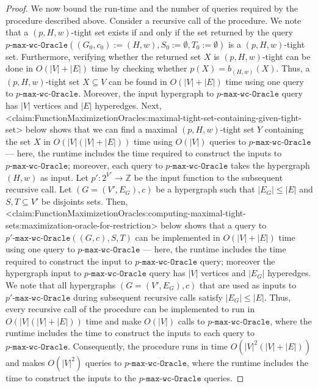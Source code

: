 \documentclass{article}
\def\Cref#1{<#1>}%
\newcommand{\functionMaximizationOracle}[1]{\ensuremath{{#1}\text{-}\mathtt{max}\text{-}\mathtt{wc}\text{-}\mathtt{Oracle}}\xspace}
\providecommand{\Z}{\mathbb{Z}}
\begin{document}
\begin{proof}
We now bound the run-time and the number of queries required by the procedure described above. Consider a recursive call of the procedure.
We note that a $(p, H, w)$-tight set exists if and only if the set returned by the query $\functionMaximizationOracle{p}((G_0, c_0):= (H, w), S_0:=\emptyset, T_0:=\emptyset)$ is a $(p, H, w)$-tight set.
Furthermore, verifying whether the returned set $X$ is $(p, H, w)$-tight can be done in $O(|V| + |E|)$ time by checking whether $p(X) = b_{(H,w)}(X)$.
Thus, a $(p, H, w)$-tight set $X\subseteq V$ can be found in  $O(|V| + |E|)$ time using one query to \functionMaximizationOracle{p}. Moreover, the input hypergraph to \functionMaximizationOracle{p} query has $|V|$ vertices and $|E|$ hyperedges.
Next, \Cref{claim:FunctionMaximizetionOracles:maximal-tight-set-containing-given-tight-set} below shows that we can find a maximal $(p, H, w)$-tight set $Y$ containing the set $X$ in $O(|V|(|V|+|E|))$ time using $O(|V|)$ queries to \functionMaximizationOracle{p} --- here, the runtime includes the time required to construct the inputs to \functionMaximizationOracle{p}; moreover, each query to \functionMaximizationOracle{p} takes the hypergraph $(H, w)$ as input.
Let $p':2^{V'}\rightarrow\Z$ be the input function to the subsequent recursive call. Let $(G = (V', E_G), c)$ be a hypergraph such that $|E_G| \leq |E|$ and $S, T \subseteq V'$ be disjoints sets. 
Then, \Cref{claim:FunctionMaximizetionOracles:computing-maximal-tight-sets:maximization-oracle-for-restriction} below shows that a query to $\functionMaximizationOracle{p'}((G, c), S, T)$ can be implemented in $O(|V| + |E|)$ time using one query to \functionMaximizationOracle{p} --- here, the runtime includes the time required to construct the input to \functionMaximizationOracle{p} query; moreover the hypergraph input to \functionMaximizationOracle{p} query has $|V|$ vertices and $|E_G|$ hyperedges. We note that all hypergraphs $(G = (V', E_G), c)$ that are used as inputs to \functionMaximizationOracle{p'} during subsequent recursive calls satisfy $|E_G| \leq |E|$.
Thus, every recursive call of the procedure can be implemented to run in $O(|V|(|V|+|E|))$ time and make $O(|V|)$ calls to \functionMaximizationOracle{p}, where the runtime includes the time to construct the inputs to each query to \functionMaximizationOracle{p}. Consequently, the procedure runs in time $O(|V|^2(|V|+|E|))$ and makes $O(|V|^2)$ queries to $\functionMaximizationOracle{p}$, where the runtime includes the time to construct the inputs to the \functionMaximizationOracle{p} queries.
\end{proof}
\end{document}
